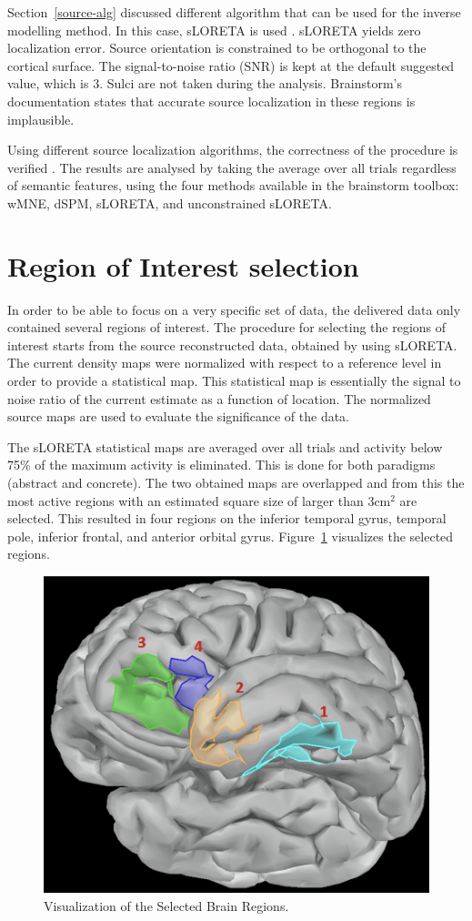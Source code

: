 Section~\ref{source-alg} discussed different algorithm that can be used for the inverse modelling method. In this case, sLORETA is used \cite{pascual2002standardized}. sLORETA yields zero localization error. Source orientation is constrained to be orthogonal to the cortical surface. The signal-to-noise ratio (SNR) is kept at the default suggested value, which is 3. Sulci are not taken during the analysis. Brainstorm's documentation states that accurate source localization in these regions is implausible.

Using different source localization algorithms, the correctness of the procedure is verified \cite{mahjoory2017consistency}. The results are analysed by taking the average over all trials regardless of semantic features, using the four methods available in the brainstorm toolbox: wMNE, dSPM, sLORETA, and unconstrained sLORETA.

\section{Region of Interest selection}

In order to be able to focus on a very specific set of data, the delivered data only contained several regions of interest. The procedure for selecting the regions of interest starts from the source reconstructed data, obtained by using sLORETA. The current density maps were normalized with respect to a reference level in order to provide a statistical map. This statistical map is essentially the signal to noise ratio of the current estimate as a function of location. The normalized source maps are used to evaluate the significance of the data. 

The sLORETA statistical maps are averaged over all trials and activity below 75\% of the maximum activity is eliminated. This is done for both paradigms (abstract and concrete). The two obtained maps are overlapped and from this the most active regions with an estimated square size of larger than 3cm$^2$ are selected. This resulted in four regions on the inferior temporal gyrus, temporal pole, inferior frontal, and anterior orbital gyrus. Figure~\ref{experiment-2} visualizes the selected regions.

\begin{figure}[!htb]
\caption{Visualization of the Selected Brain Regions.}
\label{experiment-2}
    \centering
    \includegraphics[width=\textwidth]{fig/experiment-2}
\end{figure}
